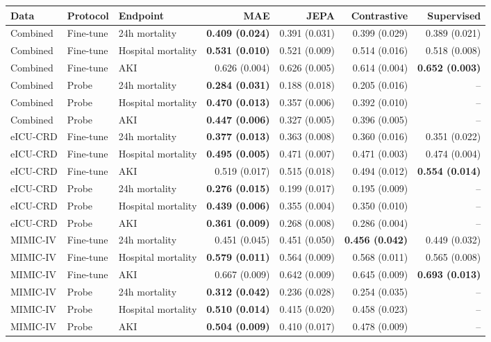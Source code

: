 \begin{tabular}{lllrrrr}
\toprule
Data & Protocol & Endpoint & MAE & JEPA & Contrastive & Supervised \\
\midrule
Combined & Fine-tune & 24h mortality & \textbf{0.409 (0.024)} & 0.391 (0.031) & 0.399 (0.029) & 0.389 (0.021) \\
Combined & Fine-tune & Hospital mortality & \textbf{0.531 (0.010)} & 0.521 (0.009) & 0.514 (0.016) & 0.518 (0.008) \\
Combined & Fine-tune & AKI & 0.626 (0.004) & 0.626 (0.005) & 0.614 (0.004) & \textbf{0.652 (0.003)} \\
Combined & Probe & 24h mortality & \textbf{0.284 (0.031)} & 0.188 (0.018) & 0.205 (0.016) & -- \\
Combined & Probe & Hospital mortality & \textbf{0.470 (0.013)} & 0.357 (0.006) & 0.392 (0.010) & -- \\
Combined & Probe & AKI & \textbf{0.447 (0.006)} & 0.327 (0.005) & 0.396 (0.005) & -- \\
eICU-CRD & Fine-tune & 24h mortality & \textbf{0.377 (0.013)} & 0.363 (0.008) & 0.360 (0.016) & 0.351 (0.022) \\
eICU-CRD & Fine-tune & Hospital mortality & \textbf{0.495 (0.005)} & 0.471 (0.007) & 0.471 (0.003) & 0.474 (0.004) \\
eICU-CRD & Fine-tune & AKI & 0.519 (0.017) & 0.515 (0.018) & 0.494 (0.012) & \textbf{0.554 (0.014)} \\
eICU-CRD & Probe & 24h mortality & \textbf{0.276 (0.015)} & 0.199 (0.017) & 0.195 (0.009) & -- \\
eICU-CRD & Probe & Hospital mortality & \textbf{0.439 (0.006)} & 0.355 (0.004) & 0.350 (0.010) & -- \\
eICU-CRD & Probe & AKI & \textbf{0.361 (0.009)} & 0.268 (0.008) & 0.286 (0.004) & -- \\
MIMIC-IV & Fine-tune & 24h mortality & 0.451 (0.045) & 0.451 (0.050) & \textbf{0.456 (0.042)} & 0.449 (0.032) \\
MIMIC-IV & Fine-tune & Hospital mortality & \textbf{0.579 (0.011)} & 0.564 (0.009) & 0.568 (0.011) & 0.565 (0.008) \\
MIMIC-IV & Fine-tune & AKI & 0.667 (0.009) & 0.642 (0.009) & 0.645 (0.009) & \textbf{0.693 (0.013)} \\
MIMIC-IV & Probe & 24h mortality & \textbf{0.312 (0.042)} & 0.236 (0.028) & 0.254 (0.035) & -- \\
MIMIC-IV & Probe & Hospital mortality & \textbf{0.510 (0.014)} & 0.415 (0.020) & 0.458 (0.023) & -- \\
MIMIC-IV & Probe & AKI & \textbf{0.504 (0.009)} & 0.410 (0.017) & 0.478 (0.009) & -- \\
\bottomrule
\end{tabular}
